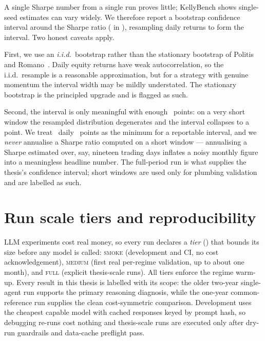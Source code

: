 A single Sharpe number from a single run proves little; KellyBench shows single-seed
estimates can vary widely. We therefore report a bootstrap confidence interval around the
Sharpe ratio ( in ), resampling daily
returns to form the interval. Two honest caveats apply.

First, we use an \emph{i.i.d.}\ bootstrap rather than the stationary bootstrap of
Politis and Romano~\cite{politis1994}. Daily equity returns have weak autocorrelation, so
the i.i.d.\ resample is a reasonable approximation, but for a strategy with genuine momentum
the interval width may be mildly understated. The stationary bootstrap is the principled
upgrade and is flagged as such.

Second, the interval is only meaningful with enough \nav\ points: on a very short window the
resampled distribution degenerates and the interval collapses to a point. We treat
\minNavPoints\ daily \nav\ points as the minimum for a reportable interval, and we
\emph{never} annualise a Sharpe ratio computed on a short window --- annualising a Sharpe
estimated over, say, nineteen trading days inflates a noisy monthly figure into a
meaningless headline number. The full-period run is what supplies the thesis's confidence
interval; short windows are used only for plumbing validation and are labelled as such.

\section{Run scale tiers and reproducibility}
\label{sec:tiers}

LLM experiments cost real money, so every run declares a \emph{tier} ()
that bounds its size before any model is called: \textsc{smoke} (development and CI, no cost
acknowledgement), \textsc{medium} (first real per-regime validation, up to about one month),
and \textsc{full} (explicit thesis-scale runs). All tiers enforce the regime warm-up. Every
result in this thesis is labelled with its scope: the older two-year single-agent run supports
the primary reasoning diagnosis, while the one-year common-reference run supplies the clean
cost-symmetric comparison. Development uses the cheapest capable model with cached responses
keyed by prompt hash, so debugging re-runs cost nothing and thesis-scale runs are executed only
after dry-run guardrails and data-cache preflight pass.
